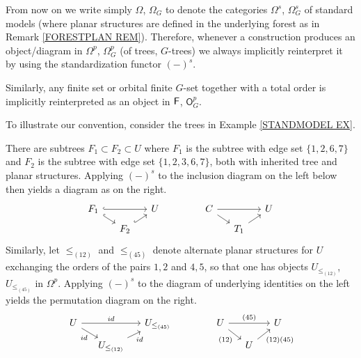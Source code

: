 \documentclass[a4paper,10pt]{article}%
\begin{document}
\begin{convention}\label{PLANARCONV CON}
	From now on we write simply $\Omega$, $\Omega_G$ to denote the categories $\Omega^s$, $\Omega_G^s$ of standard models (where planar structures are defined in the underlying forest as in Remark \ref{FORESTPLAN REM}). 
Therefore, whenever a construction produces an object/diagram in $\Omega^p$, $\Omega^p_G$ (of trees, $G$-trees) we always implicitly reinterpret it by using the standardization functor $(\minus)^s$.

Similarly, any finite set or orbital finite $G$-set together with a total order is implicitly reinterpreted as an object in 
$\mathsf{F}$, $\mathsf{O}_G^p$.
\end{convention}


\begin{example}
To illustrate our convention, consider the trees in Example \ref{STANDMODEL EX}. 

There are subtrees
$F_1 \subset F_2 \subset U$
where $F_1$ is the subtree with edge set $\{1,2,6,7\}$ and 
$F_2$ is the subtree with edge set $\{1,2,3,6,7\}$, both with inherited tree and planar structures. 
Applying $(\minus)^s$ to the inclusion diagram on the left below then yields a diagram as on the right.
\[
\begin{tikzcd}[row sep = 0.5em,column sep =1.3em]
	F_1 \ar[hookrightarrow]{rr} \ar[hookrightarrow]{rd} & & U & &&
	C \ar{rr} \ar{rd} & & U
\\
	& F_2 \ar[hookrightarrow]{ru} & & &&
	& T_1 \ar{ru}
\end{tikzcd}
\]
Similarly, let $\leq_{(12)}$ and $\leq_{(45)}$ denote alternate planar structures for $U$ exchanging the orders of the pairs $1,2$ and $4,5$, so that one has objects 
$U_{\leq_{(12)}}$, $U_{\leq_{(45)}}$ in $\Omega^p$. 
Applying $(\minus)^s$ to the diagram of underlying identities on the left yields the permutation diagram on the right.
\[
\begin{tikzcd}[row sep = 0.5em,column sep =1.3em]
	U \ar{rr}{id} \ar{rd}[swap]{id} & & U_{\leq_{(45)}} & & &
	U \ar{rr}{(45)} \ar{rd}[swap]{(12)} & & U
\\
	& U_{\leq_{(12)}} \ar{ru}[swap]{id} & & & &
	& U \ar{ru}[swap]{(12)(45)}
\end{tikzcd}
\]
\end{example}
\end{document}
